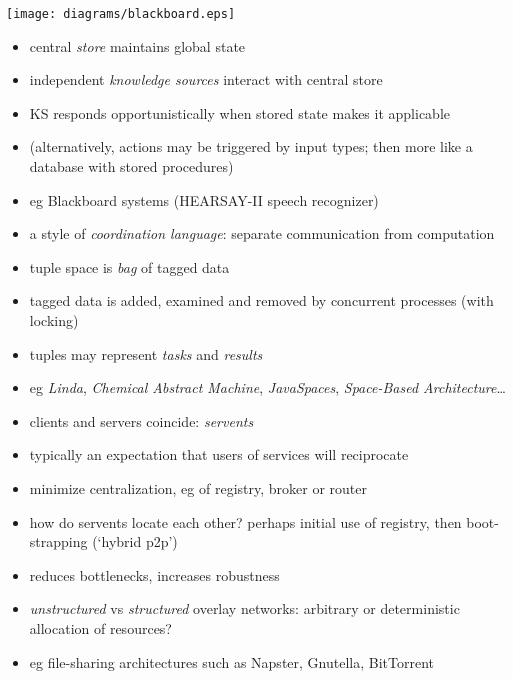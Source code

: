 \documentclass{sepslide-soa-faked} %
\begin{document}
\begin{slide}
\begin{center}
\texttt{[image: diagrams/blackboard.eps]}
\end{center}
\end{slide}
\begin{slide}
  \begin{itemize}
  \item central \emph{store} maintains global state
  \item independent \emph{knowledge sources} interact with central store
  \item KS responds opportunistically when stored state makes it applicable
  \item (alternatively, actions may be triggered by input types; then
    more like a database with stored procedures)
  \item eg Blackboard systems (HEARSAY-II speech recognizer)
  \end{itemize}
\end{slide}

\begin{slide}
  \begin{itemize}
  \item a style of \emph{coordination language}: separate communication from
    computation
  \item tuple space is \emph{bag} of tagged data
  \item tagged data is added, examined and removed by concurrent processes (with
    locking)
  \item tuples may represent \emph{tasks} and \emph{results}
  \item eg \emph{Linda}, \emph{Chemical Abstract Machine},
    \emph{JavaSpaces}, \emph{Space-Based Architecture}\ldots
  \end{itemize}
\end{slide}

\begin{slide}
  \begin{itemize}
  \item clients and servers coincide: \emph{servents}
  \item typically an expectation that users of services will reciprocate
  \item minimize centralization, eg of registry, broker or router
  \item how do servents locate each other? perhaps initial use of
    registry, then boot-strapping (`hybrid p2p')
  \item reduces bottlenecks, increases robustness
  \item \emph{unstructured} vs \emph{structured} overlay networks:
    arbitrary or deterministic allocation of resources?
  \item eg file-sharing architectures such as Napster, Gnutella, BitTorrent
  \end{itemize}
\end{slide}
\end{document}
